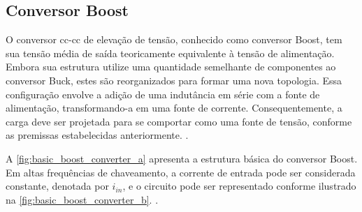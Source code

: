 \subsection{Conversor Boost}

O conversor \acrshort{cc}-\acrshort{cc} de elevação de tensão, conhecido como conversor Boost, tem sua tensão média de saída teoricamente equivalente à tensão de alimentação. Embora sua estrutura utilize uma quantidade semelhante de componentes ao conversor Buck, estes são reorganizados para formar uma nova topologia. Essa configuração envolve a adição de uma indutância em série com a fonte de alimentação, transformando-a em uma fonte de corrente. Consequentemente, a carga deve ser projetada para se comportar como uma fonte de tensão, conforme as premissas estabelecidas anteriormente. \cite{martins2008}.

A \autoref{fig:basic_boost_converter_a} apresenta a estrutura básica do conversor Boost. Em altas frequências de chaveamento, a corrente de entrada pode ser considerada constante, denotada por $i_{in}$, e o circuito pode ser representado conforme ilustrado na \autoref{fig:basic_boost_converter_b}. \cite{martins2008}.

